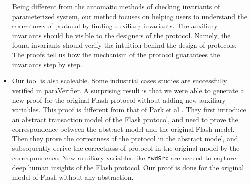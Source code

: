 \begin{itemize}
%
%
Being different from  the automatic  methods of checking
invariants of parameterized system, our method focuses on helping
users to understand  the correctness of protocol  by finding
auxiliary invariants. The auxiliary invariants should
be visible to the designers of the protocol. Namely,  the found
invariants should verify the intuition behind the design of
protocols. The proofs tell us how the mechanism of the protocol
guarantees the invariants step by step.

\item Our tool is also scaleable. Some industrial cases studies are
successfully verified in {\sf paraVerifier}.
A surprising result is that we were able to generate a new
proof for the original Flash protocol without adding new auxiliary
variables. This proof is different from that of Park et al \cite{}.
They first introduce an abstract transaction model of the Flash
protocol, and need to prove the correspondence between the abstract model and the original Flash
model. Then they prove the correctness of the protocol in the abstract
model, and subsequently derive the correctness of protocol in the
original model by the correspondence. New auxiliary variables
like {\tt fwdSrc} are needed to capture deep human insights of the Flash protocol.
Our proof is done for the original model
of Flash without any abstraction.
\end{itemize}
